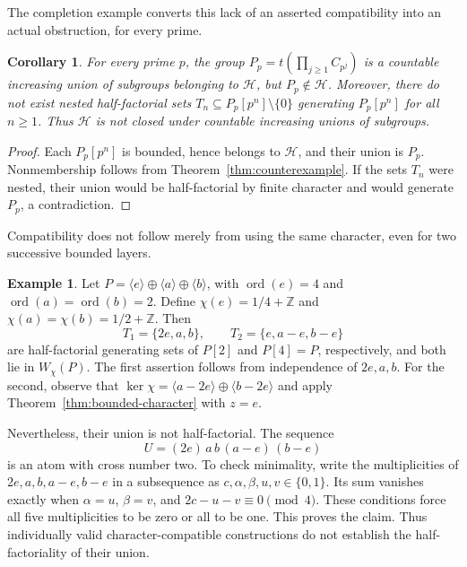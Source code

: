 \documentclass[11pt,reqno]{amsart}
\numberwithin{equation}{section}
\newtheorem{corollary}[theorem]{Corollary}
\theoremstyle{definition}
\newtheorem{example}[theorem]{Example}
\theoremstyle{remark}
\newcommand{\Z}{\mathbb Z}
\newcommand{\HF}{\mathcal H}
\DeclareMathOperator{\ord}{ord}
\begin{document}
The completion example converts this lack of an asserted compatibility
into an actual obstruction, for every prime.

\begin{corollary}\label{cor:increasing-unions}
For every prime $p$, the group $P_p=t(\prod_{j\ge1}C_{p^j})$ is a
countable increasing union of subgroups belonging to $\HF$, but
$P_p\notin\HF$. Moreover, there do not exist nested half-factorial
sets $T_n\subseteq P_p[p^n]\setminus\{0\}$ generating $P_p[p^n]$
for all $n\ge1$. Thus $\HF$ is not closed under countable increasing
unions of subgroups.
\end{corollary}

\begin{proof}
Each $P_p[p^n]$ is bounded, hence belongs to $\HF$, and their union
is $P_p$. Nonmembership follows from
Theorem~\ref{thm:counterexample}. If the sets $T_n$ were nested,
their union would be half-factorial by finite character and would
generate $P_p$, a contradiction.
\end{proof}

Compatibility does not follow merely from using the same character,
even for two successive bounded layers.

\begin{example}\label{ex:incompatible-layers}
Let $P=\langle e\rangle\oplus\langle a\rangle
\oplus\langle b\rangle$, with $\ord(e)=4$ and
$\ord(a)=\ord(b)=2$. Define
$\chi(e)=1/4+\Z$ and $\chi(a)=\chi(b)=1/2+\Z$. Then
\[
 T_1=\{2e,a,b\},\qquad T_2=\{e,a-e,b-e\}
\]
are half-factorial generating sets of $P[2]$ and $P[4]=P$,
respectively, and both lie in $W_\chi(P)$.
The first assertion follows from independence of $2e,a,b$.
For the second, observe that
$\ker\chi=\langle a-2e\rangle\oplus\langle b-2e\rangle$ and
apply Theorem~\ref{thm:bounded-character} with $z=e$.

Nevertheless, their union is not half-factorial. The sequence
\begin{equation}\label{eq:layer-atom}
 U=(2e)\,a\,b\,(a-e)\,(b-e)
\end{equation}
is an atom with cross number two. To check minimality, write the
multiplicities of $2e,a,b,a-e,b-e$ in a subsequence as
$c,\alpha,\beta,u,v\in\{0,1\}$. Its sum vanishes exactly when
$\alpha=u$, $\beta=v$, and $2c-u-v\equiv0\pmod4$.
These conditions force all five multiplicities to be zero or all
to be one. This proves the claim. Thus individually valid
character-compatible constructions do not establish the
half-factoriality of their union.
\end{example}
\end{document}
